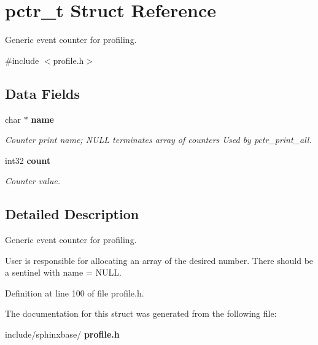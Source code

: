 \section{pctr\+\_\+t Struct Reference}
\label{structpctr__t}


Generic event counter for profiling.  




{\ttfamily \#include $<$profile.\+h$>$}

\subsection*{Data Fields}
\begin{DoxyCompactItemize}
\item 
\mbox{\label{structpctr__t_a9674298e968c73272d477593c7b41ed5}} 
char $\ast$ \textbf{ name}
\begin{DoxyCompactList}\small\item\em Counter print name; N\+U\+LL terminates array of counters Used by pctr\+\_\+print\+\_\+all. \end{DoxyCompactList}\item 
\mbox{\label{structpctr__t_adc5e6467eceb66d4f56a20514d06eb55}} 
int32 \textbf{ count}
\begin{DoxyCompactList}\small\item\em Counter value. \end{DoxyCompactList}\end{DoxyCompactItemize}


\subsection{Detailed Description}
Generic event counter for profiling. 

User is responsible for allocating an array of the desired number. There should be a sentinel with name = N\+U\+LL. 

Definition at line 100 of file profile.\+h.



The documentation for this struct was generated from the following file\+:\begin{DoxyCompactItemize}
\item 
include/sphinxbase/\textbf{ profile.\+h}\end{DoxyCompactItemize}
